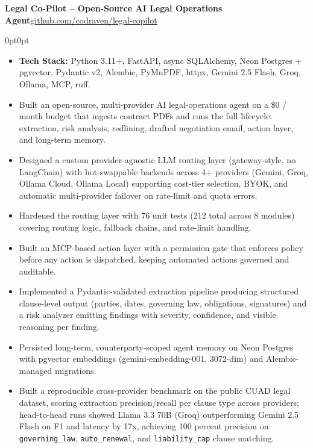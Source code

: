 \documentclass[10pt, letterpaper]{article}
\newenvironment{onecolentry}{
    \begin{adjustwidth}{0pt}{0pt}
}{
    \end{adjustwidth}
}
\newenvironment{highlights}{
    \begin{itemize}[topsep=2pt, parsep=0pt, partopsep=0pt, itemsep=2pt, leftmargin=0.8cm]
}{
    \end{itemize}
}
\newcommand{\headerrow}[2]{%
    \noindent\textbf{#1}\hfill #2\par%
}
\begin{document}
\vspace{6pt}
\headerrow{Legal Co-Pilot -- Open-Source AI Legal Operations Agent}{\href{https://github.com/codraven/legal-copilot}{github.com/codraven/legal-copilot}}

\vspace{-2pt}
\begin{onecolentry}
\begin{highlights}
    \item \textbf{Tech Stack:} Python 3.11+, FastAPI, async SQLAlchemy, Neon Postgres + pgvector, Pydantic v2, Alembic, PyMuPDF, httpx, Gemini 2.5 Flash, Groq, Ollama, MCP, ruff.
    \item Built an open-source, multi-provider AI legal-operations agent on a \$0 / month budget that ingests contract PDFs and runs the full lifecycle: extraction, risk analysis, redlining, drafted negotiation email, action layer, and long-term memory.
    \item Designed a custom provider-agnostic LLM routing layer (gateway-style, no LangChain) with hot-swappable backends across 4+ providers (Gemini, Groq, Ollama Cloud, Ollama Local) supporting cost-tier selection, BYOK, and automatic multi-provider failover on rate-limit and quota errors.
    \item Hardened the routing layer with 76 unit tests (212 total across 8 modules) covering routing logic, fallback chains, and rate-limit handling.
    \item Built an MCP-based action layer with a permission gate that enforces policy before any action is dispatched, keeping automated actions governed and auditable.
    \item Implemented a Pydantic-validated extraction pipeline producing structured clause-level output (parties, dates, governing law, obligations, signatures) and a risk analyzer emitting findings with severity, confidence, and visible reasoning per finding.
    \item Persisted long-term, counterparty-scoped agent memory on Neon Postgres with pgvector embeddings (gemini-embedding-001, 3072-dim) and Alembic-managed migrations.
    \item Built a reproducible cross-provider benchmark on the public CUAD legal dataset, scoring extraction precision/recall per clause type across providers; head-to-head runs showed Llama 3.3 70B (Groq) outperforming Gemini 2.5 Flash on F1 and latency by 17x, achieving 100 percent precision on \texttt{governing\_law}, \texttt{auto\_renewal}, and \texttt{liability\_cap} clause matching.
\end{highlights}
\end{onecolentry}
\end{document}
